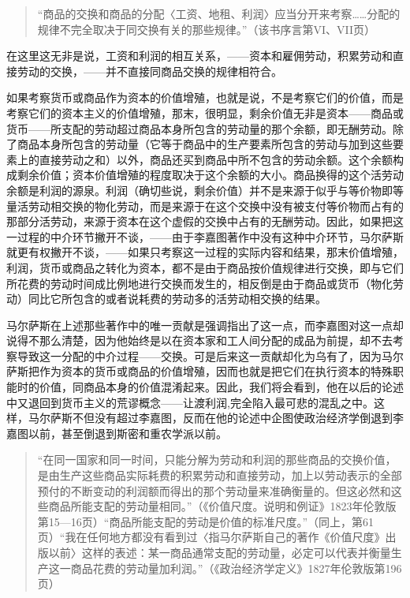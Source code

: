 \begin{quote}{“商品的交换和商品的分配〈工资、地租、利润〉应当分开来考察……分配的规律不完全取决于同交换有关的那些规律。”（该书序言第VI、VII页）}\end{quote}

在这里这无非是说，工资和利润的相互关系，——资本和雇佣劳动，积累劳动和直接劳动的交换，——并不直接同商品交换的规律相符合。

如果考察货币或商品作为资本的价值增殖，也就是说，不是考察它们的价值，而是考察它们的资本主义的价值增殖，那末，很明显，剩余价值无非是资本——商品或货币——所支配的劳动超过商品本身所包含的劳动量的那个余额，即无酬劳动。除了商品本身所包含的劳动量（它等于商品中的生产要素所包含的劳动与加到这些要素上的直接劳动之和）以外，商品还买到商品中所不包含的劳动余额。这个余额构成剩余价值；资本价值增殖的程度取决于这个余额的大小。商品换得的这个活劳动余额是利润的源泉。利润（确切些说，剩余价值）并不是来源于似乎与等价物即等量活劳动相交换的物化劳动，而是来源于在这个交换中没有被支付等价物而占有的那部分活劳动，来源于资本在这个虚假的交换中占有的无酬劳动。因此，如果把这一过程的中介环节撇开不谈，——由于李嘉图著作中没有这种中介环节，马尔萨斯就更有权撇开不谈，——如果只考察这一过程的实际内容和结果，那末价值增殖，利润，货币或商品之转化为资本，都不是由于商品按价值规律进行交换，即与它们所花费的劳动时间成比例地进行交换而发生的，相反倒是由于商品或货币（物化劳动）同比它所包含的或者说耗费的劳动多的活劳动相交换的结果。

马尔萨斯在上述那些著作中的唯一贡献是强调指出了这一点，而李嘉图对这一点却说得不那么清楚，因为他始终是以在资本家和工人间分配的成品为前提，却不去考察导致这一分配的中介过程——交换。可是后来这一贡献却化为乌有了，因为马尔萨斯把作为资本的货币或商品的价值增殖，因而也就是把它们在执行资本的特殊职能时的价值，同商品本身的价值混淆起来。因此，我们将会看到，他在以后的论述中又退回到货币主义的荒谬概念——让渡利润,完全陷入最可悲的混乱之中。这样，马尔萨斯不但没有超过李嘉图，反而在他的论述中企图使政治经济学倒退到李嘉图以前，甚至倒退到斯密和重农学派以前。

\begin{quote}{“在同一国家和同一时间，只能分解为劳动和利润的那些商品的交换价值，是由生产这些商品实际耗费的积累劳动和直接劳动，加上以劳动表示的全部预付的不断变动的利润额而得出的那个劳动量来准确衡量的。但这必然和这些商品所能支配的劳动量相同。”（《价值尺度。说明和例证》1823年伦敦版第15—16页）“商品所能支配的劳动是价值的标准尺度。”（同上，第61页）“我在任何地方都没有看到过〈指马尔萨斯自己的著作《价值尺度》出版以前〉这样的表述：某一商品通常支配的劳动量，必定可以代表并衡量生产这一商品花费的劳动量加利润。”（《政治经济学定义》1827年伦敦版第196页）}\end{quote}

